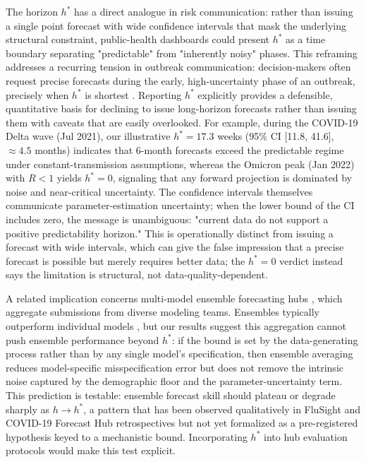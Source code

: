 \documentclass[review]{elsarticle}
\theoremstyle{plain}
\theoremstyle{definition}
\begin{document}
The horizon $h^*$ has a direct analogue in risk communication: rather than issuing a single point forecast with wide confidence intervals that mask the underlying structural constraint, public-health dashboards could present $h^*$ as a time boundary separating "predictable" from "inherently noisy" phases. This reframing addresses a recurring tension in outbreak communication: decision-makers often request precise forecasts during the early, high-uncertainty phase of an outbreak, precisely when $h^*$ is shortest \citep{viboud2018rapidd, funk2018realtime}. Reporting $h^*$ explicitly provides a defensible, quantitative basis for declining to issue long-horizon forecasts rather than issuing them with caveats that are easily overlooked. For example, during the COVID-19 Delta wave (Jul 2021), our illustrative $h^* = 17.3$ weeks (95\% CI [11.8, 41.6], $\approx 4.5$ months) indicates that 6-month forecasts exceed the predictable regime under constant-transmission assumptions, whereas the Omicron peak (Jan 2022) with $R < 1$ yields $h^* = 0$, signaling that any forward projection is dominated by noise and near-critical uncertainty. The confidence intervals themselves communicate parameter-estimation uncertainty; when the lower bound of the CI includes zero, the message is unambiguous: "current data do not support a positive predictability horizon." This is operationally distinct from issuing a forecast with wide intervals, which can give the false impression that a precise forecast is possible but merely requires better data; the $h^* = 0$ verdict instead says the limitation is structural, not data-quality-dependent.

A related implication concerns multi-model ensemble forecasting hubs \citep{mcgowan2019collaborative, reich2019collaborative, cramer2022evaluation}, which aggregate submissions from diverse modeling teams. Ensembles typically outperform individual models \citep{ray2020ensemble}, but our results suggest this aggregation cannot push ensemble performance beyond $h^*$: if the bound is set by the data-generating process rather than by any single model's specification, then ensemble averaging reduces model-specific misspecification error but does not remove the intrinsic noise captured by the demographic floor and the parameter-uncertainty term. This prediction is testable: ensemble forecast skill should plateau or degrade sharply as $h \to h^*$, a pattern that has been observed qualitatively in FluSight and COVID-19 Forecast Hub retrospectives \citep{mcgowan2019collaborative, cramer2022evaluation} but not yet formalized as a pre-registered hypothesis keyed to a mechanistic bound. Incorporating $h^*$ into hub evaluation protocols would make this test explicit.
\end{document}
